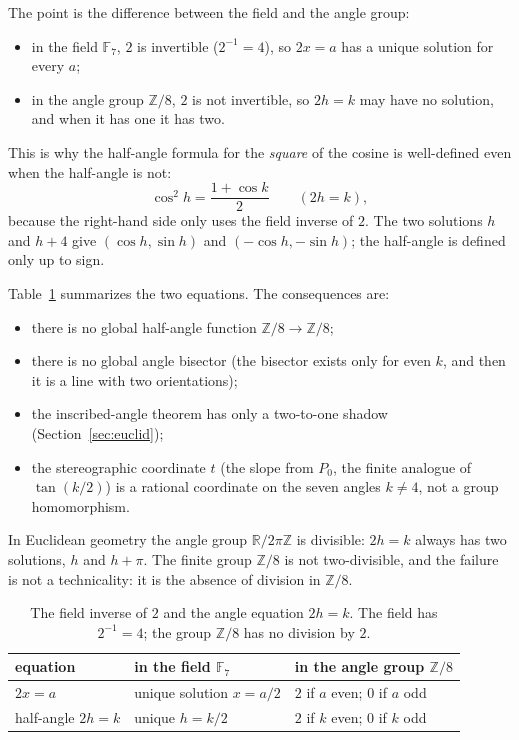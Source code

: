 \documentclass[11pt]{article}
\theoremstyle{definition}
\theoremstyle{remark}
\newcommand{\F}{\mathbb{F}}
\newcommand{\Z}{\mathbb{Z}}
\begin{document}
The point is the difference between the field and the angle group:

\begin{itemize}
\item in the field $\F_7$, $2$ is invertible ($2^{-1}=4$), so $2x=a$ has a
      unique solution for every $a$;
\item in the angle group $\Z/8$, $2$ is not invertible, so $2h=k$ may have no
      solution, and when it has one it has two.
\end{itemize}

This is why the half-angle formula for the \emph{square} of the cosine is
well-defined even when the half-angle is not:
\[
  \cos^2 h=\frac{1+\cos k}{2}\qquad(2h=k),
\]
because the right-hand side only uses the field inverse of $2$.  The two
solutions $h$ and $h+4$ give $(\cos h,\sin h)$ and $(-\cos h,-\sin h)$; the
half-angle is defined only up to sign.

Table~\ref{tab:half-angle} summarizes the two equations.  The consequences
are:

\begin{itemize}
\item there is no global half-angle function $\Z/8\to\Z/8$;
\item there is no global angle bisector (the bisector exists only for even $k$,
      and then it is a line with two orientations);
\item the inscribed-angle theorem has only a two-to-one shadow
      (Section~\ref{sec:euclid});
\item the stereographic coordinate $t$ (the slope from $P_0$, the finite
      analogue of $\tan(k/2)$) is a rational coordinate on the seven angles
      $k\ne4$, not a group homomorphism.
\end{itemize}

In Euclidean geometry the angle group $\mathbb R/2\pi\mathbb Z$ is divisible:
$2h=k$ always has two solutions, $h$ and $h+\pi$.  The finite group $\Z/8$ is
not two-divisible, and the failure is not a technicality: it is the absence of
division in $\Z/8$.

\begin{table}[htbp]
\centering
\small
\begin{tabular}{@{}lll@{}}
\toprule
equation & in the field $\F_7$ & in the angle group $\Z/8$\\
\midrule
$2x=a$ & unique solution $x=a/2$ & $2$ if $a$ even; $0$ if $a$ odd\\
half-angle $2h=k$ & unique $h=k/2$ & $2$ if $k$ even; $0$ if $k$ odd\\
\bottomrule
\end{tabular}
\caption{The field inverse of $2$ and the angle equation $2h=k$.  The field has
$2^{-1}=4$; the group $\Z/8$ has no division by $2$.}
\label{tab:half-angle}
\end{table}
\end{document}
